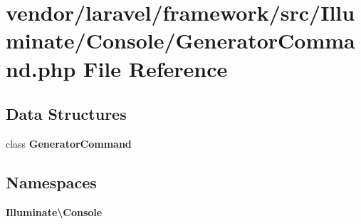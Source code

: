 \section{vendor/laravel/framework/src/\+Illuminate/\+Console/\+Generator\+Command.php File Reference}
\label{_generator_command_8php}
\subsection*{Data Structures}
\begin{DoxyCompactItemize}
\item 
class {\bf Generator\+Command}
\end{DoxyCompactItemize}
\subsection*{Namespaces}
\begin{DoxyCompactItemize}
\item 
 {\bf Illuminate\textbackslash{}\+Console}
\end{DoxyCompactItemize}
